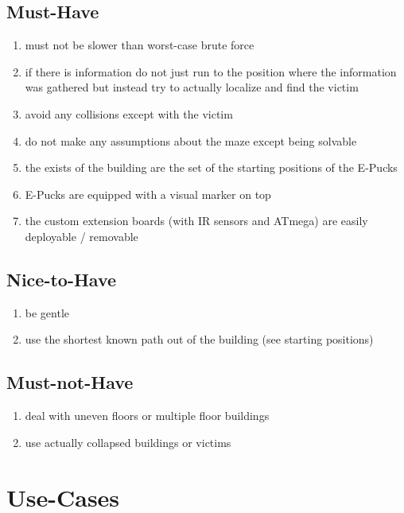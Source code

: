 \documentclass[a4paper,parskip,headheight=38pt]{scrartcl} %
\begin{document}
\subsection{Must-Have}
\begin{enumerate}[label=\musthave]
\item must not be slower than worst-case brute force
\item if there is information do not just run to the position where the information was gathered but instead try to actually localize and find the victim
\item avoid any collisions except with the victim
\item do not make any assumptions about the maze except being solvable
\item the exists of the building are the set of the starting positions of the E-Pucks
\item E-Pucks are equipped with a visual marker on top
\item the custom extension boards (with IR sensors and ATmega) are easily deployable / removable
\end{enumerate}

\subsection{Nice-to-Have}
\begin{enumerate}[label=\nicetohave]
\item be gentle
\item use the shortest known path out of the building (see starting positions)
\end{enumerate}

\subsection{Must-not-Have}
\begin{enumerate}[label=\mustnothave]
\item deal with uneven floors or multiple floor buildings
\item use actually collapsed buildings or victims
\end{enumerate}


\section{Use-Cases}
\end{document}
